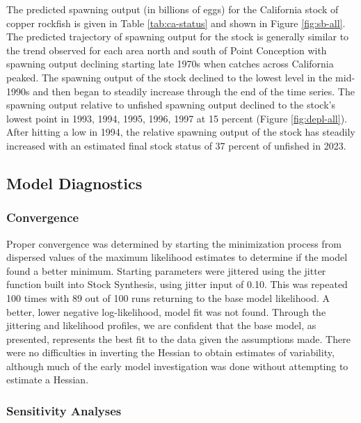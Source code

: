 \documentclass[11pt,
  letterpaper,
]{article}
\begin{document}
The predicted spawning output (in billions of eggs) for the California stock of copper rockfish is given in Table \ref{tab:ca-status} and shown in Figure \ref{fig:sb-all}. The predicted trajectory of spawning output for the stock is generally similar to the trend observed for each area north and south of Point Conception with spawning output declining starting late 1970s when catches across California peaked. The spawning output of the stock declined to the lowest level in the mid-1990s and then began to steadily increase through the end of the time series. The spawning output relative to unfished spawning output declined to the stock's lowest point in 1993, 1994, 1995, 1996, 1997 at 15 percent (Figure \ref{fig:depl-all}). After hitting a low in 1994, the relative spawning output of the stock has steadily increased with an estimated final stock status of 37 percent of unfished in 2023.

\subsection{Model Diagnostics}\label{model-diagnostics}

\subsubsection{Convergence}\label{convergence}

Proper convergence was determined by starting the minimization process from dispersed values of the maximum likelihood estimates to determine if the model found a better minimum. Starting parameters were jittered using the jitter function built into Stock Synthesis, using jitter input of 0.10. This was repeated 100 times with 89 out of 100 runs returning to the base model likelihood. A better, lower negative log-likelihood, model fit was not found. Through the jittering and likelihood profiles, we are confident that the base model, as presented, represents the best fit to the data given the assumptions made. There were no difficulties in inverting the Hessian to obtain estimates of variability, although much of the early model investigation was done without attempting to estimate a Hessian.

\subsubsection{Sensitivity Analyses}\label{sensitivities}
\end{document}
